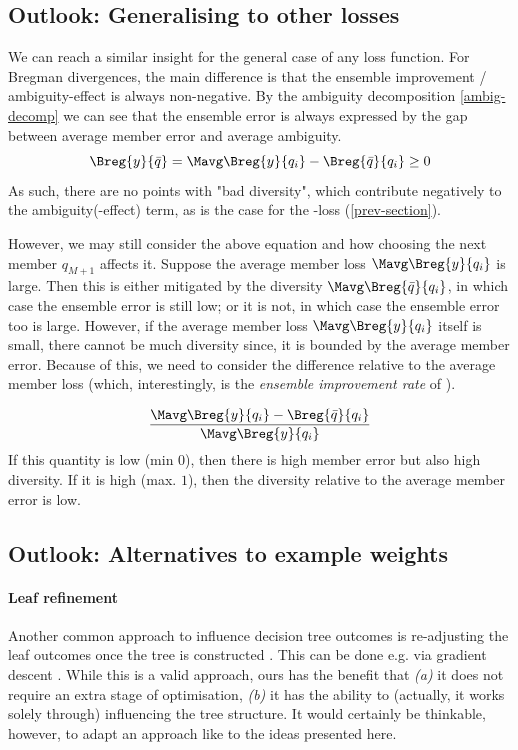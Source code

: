 \documentclass[
    a4paper, %
	fontsize=10pt, %
	twoside=false, %
]{kaobook}
\begin{document}
\subsection{Outlook: Generalising to other losses}

We can reach a similar insight for the general case of any loss function.
For Bregman divergences, the main difference is that the ensemble improvement / ambiguity-effect
is always non-negative. By the ambiguity decomposition \ref{ambig-decomp} we can see that the ensemble error is always expressed by the gap between average member error and average ambiguity. 
$$
\Breg{y}{\bar{q}} = \Mavg \Breg{y}{q_{i}} - \Breg{\bar{q}}{q_{i}} \geq 0
$$
As such, there are no points with "bad diversity", which contribute negatively to the ambiguity(-effect) term, as is the case for the \zeroone-loss (\ref{prev-section}).

However, we may still consider the above equation and how choosing the next member $q_{M+1}$ affects it. Suppose the average member loss $\Mavg \Breg{y}{q_{i}}$ is large. Then this is either mitigated by the diversity $\Mavg \Breg{\bar{q}}{q_{i}}$, in which case the ensemble error is still low; or it is not, in which case the ensemble error too is large. 
However, if the average member loss $\Mavg\Breg{y}{q_i}$ itself is small, there cannot be much diversity since, it is bounded by the average member error.  Because of this, we need to consider the difference relative to the average member loss (which, interestingly, is the \textit{ensemble improvement rate} of \cite{theisen}).

$$
\frac{
\Mavg \Breg{y}{q_{i}} - \Breg{\bar{q}}{q_{i}}
}{
\Mavg \Breg{y}{q_i}
}
$$
If this quantity is low (min $0$), then there is high member error but also high diversity. If it is high (max. $1$), then the diversity relative to the average member error is low. 

\subsection{Outlook: Alternatives to example weights}

\paragraph{Leaf refinement} Another common approach to influence decision tree outcomes is re-adjusting the leaf outcomes once the tree is constructed \cite{others}. This can be done e.g. via gradient descent \cite{buschj-negative-correlation-forests}. While this is a valid approach, ours has the benefit that \textit{(a)} it does not require an extra stage of optimisation, \textit{(b)} it has the ability to (actually, it works solely through) influencing the tree structure. It would certainly be thinkable, however, to adapt an approach like \cite{buschj-ncl-forests} to the ideas presented here.
\end{document}
